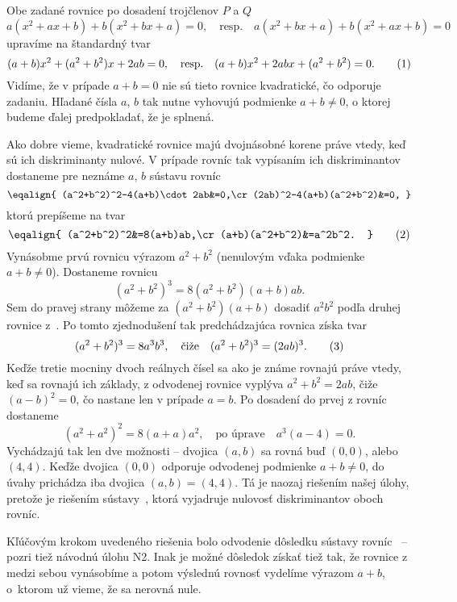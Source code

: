 {%
Obe zadané rovnice po dosadení trojčlenov $P$ a $Q$
$$
a(x^2+ax+b)+b(x^2+bx+a)=0,\quad\text{resp.}\quad
a(x^2+bx+a)+b(x^2+ax+b)=0
$$
upravíme na štandardný tvar
$$
(a+b)x^2+(a^2+b^2)x+2ab=0,\quad\text{resp.}\quad
(a+b)x^2+2abx+(a^2+b^2)=0.
\tag1
$$
Vidíme, že v prípade $a+b=0$ nie sú tieto rovnice
kvadratické, čo odporuje zadaniu. Hľadané čísla $a$, $b$ tak
nutne vyhovujú podmienke $a+b\ne0$, o ktorej budeme ďalej
predpokladať, že je splnená.

Ako dobre vieme, kvadratické rovnice majú dvojnásobné korene práve vtedy,
keď sú ich diskriminanty nulové. V prípade rovníc  tak
vypísaním ich diskriminantov dostaneme pre neznáme $a$, $b$
sústavu rovníc
$$\eqalign{
(a^2+b^2)^2-4(a+b)\cdot2ab&=0,\cr
(2ab)^2-4(a+b)(a^2+b^2)&=0,
}$$
ktorú prepíšeme na tvar
$$\eqalign{
(a^2+b^2)^2&=8(a+b)ab,\cr
(a+b)(a^2+b^2)&=a^2b^2.
}\tag2
$$
Vynásobme prvú rovnicu výrazom $a^2+b^2$ (nenulovým vďaka
podmienke $a+b\ne0$). Dostaneme rovnicu
$$
(a^2+b^2)^3=8(a^2+b^2)(a+b)ab.
$$
Sem do pravej strany môžeme za $(a^2+b^2)(a+b)$ dosadiť $a^2b^2$
podľa druhej rovnice z~. Po tomto zjednodušení tak predchádzajúca rovnica
získa tvar
$$
(a^2+b^2)^3=8a^3b^3,\quad\text{čiže}\quad(a^2+b^2)^3=(2ab)^3.
\tag3
$$
Keďže tretie mocniny dvoch reálnych čísel sa ako je známe rovnajú
práve vtedy, keď sa rovnajú ich základy, z odvodenej rovnice 
vyplýva $a^2+b^2=2ab$, čiže $(a-b)^2=0$,
čo nastane len v prípade $a=b$. Po dosadení do prvej
z rovníc  dostaneme
$$
(a^2+a^2)^2=8(a+a)a^2,\quad\text{po úprave}\quad a^3(a-4)=0.
$$
Vychádzajú tak len dve možnosti -- dvojica $(a,b)$ sa rovná buď $(0,0)$,
alebo $(4,4)$. Keďže dvojica $(0,0)$ odporuje odvodenej podmienke
$a+b\ne0$, do úvahy prichádza iba dvojica $(a,b)=(4,4)$. Tá je
naozaj riešením našej úlohy, pretože je riešením sústavy~, ktorá
vyjadruje nulovosť diskriminantov oboch rovníc.

\poznamka
Kľúčovým krokom uvedeného riešenia bolo odvodenie dôsledku 
sústavy rovníc ~-- pozri tiež návodnú úlohu N2. Inak je možné
dôsledok  získať tiež tak, že rovnice z  medzi sebou
vynásobíme a potom výslednú rovnosť vydelíme výrazom $a+b$, o~ktorom už vieme, že sa nerovná nule.

}
